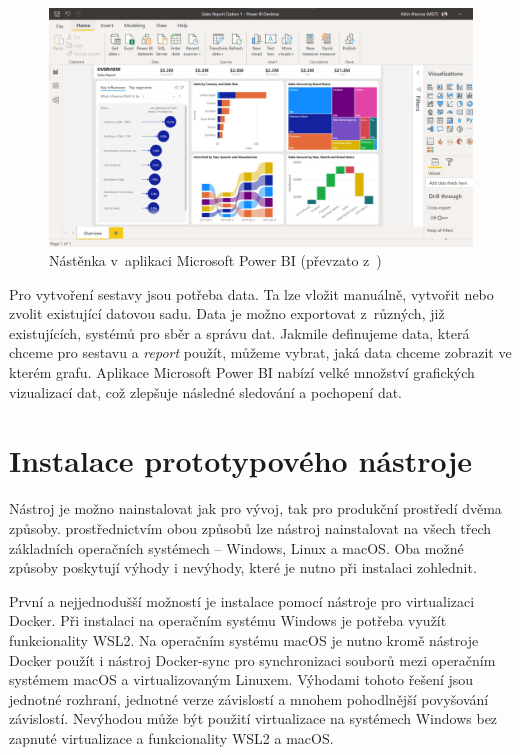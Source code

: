 \documentclass[czech,master]{diploma}
\begin{document}
\begin{figure}[!ht]
    \centering
    \includegraphics[width=1\textwidth]{Diplomka/Figures/powerbi-dashboard.jpg}
    \caption{Nástěnka v~aplikaci Microsoft Power BI (převzato z~\cite{ref:microsoft_bi_general})}
    \label{fig:powerbi_dashboard}
\end{figure}

Pro vytvoření sestavy jsou potřeba data. Ta lze vložit manuálně, vytvořit nebo zvolit existující datovou sadu. Data je možno exportovat z~různých, již existujících, systémů pro sběr a správu dat. Jakmile definujeme data, která chceme pro sestavu a \textit{report} použít, můžeme vybrat, jaká data chceme zobrazit ve kterém grafu. Aplikace Microsoft Power BI nabízí velké množství grafických vizualizací dat, což zlepšuje následné sledování a pochopení dat.


\chapter{Instalace prototypového nástroje}
Nástroj je možno nainstalovat jak pro vývoj, tak pro produkční prostředí dvěma způsoby. prostřednictvím obou způsobů lze nástroj nainstalovat na všech třech základních operačních systémech -- Windows, Linux a macOS. Oba možné způsoby poskytují výhody i nevýhody, které je nutno při instalaci zohlednit.

První a nejjednodušší možností je instalace pomocí nástroje pro virtualizaci Docker. Při instalaci na operačním systému Windows je potřeba využít funkcionality WSL2. Na operačním systému macOS je nutno kromě nástroje Docker použít i nástroj Docker-sync pro synchronizaci souborů mezi operačním systémem macOS a virtualizovaným Linuxem. Výhodami tohoto řešení jsou jednotné rozhraní, jednotné verze závislostí a mnohem pohodlnější povyšování závislostí. Nevýhodou může být použití virtualizace na systémech Windows bez zapnuté virtualizace a funkcionality WSL2 a macOS. 
\end{document}
